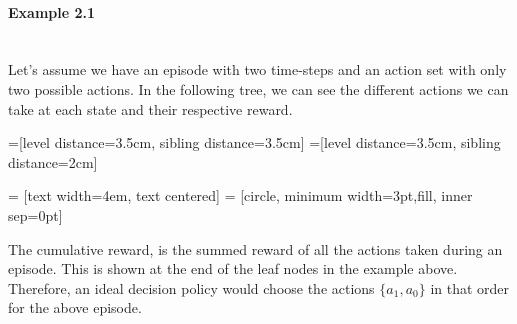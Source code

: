 \paragraph{Example 2.1}\mbox{}\\
Let's assume we have an episode with two time-steps and an action set with only two possible actions. In the following tree, we can see the different actions we can take at each state and their respective reward.

=[level distance=3.5cm, sibling distance=3.5cm]
=[level distance=3.5cm, sibling distance=2cm]

 = [text width=4em, text centered]
 = [circle, minimum width=3pt,fill, inner sep=0pt]

\begin{center}
	
\end{center}
The cumulative reward, is the summed reward of all the actions taken during an episode. This is shown at the end of the leaf nodes in the example above. Therefore, an ideal decision policy would choose the actions $\{a_1,a_0\}$ in that order for the above episode.
